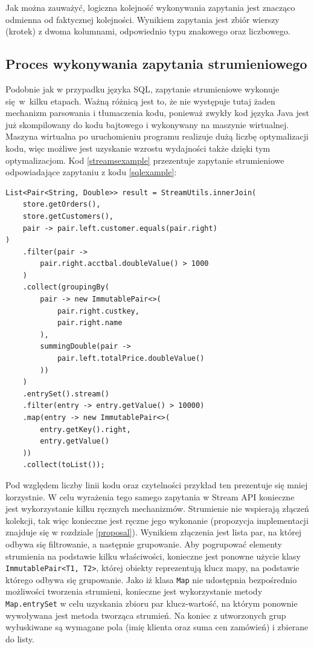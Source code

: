 \documentclass[12pt,twoside,openright]{extarticle}
\begin{document}
    Jak można zauważyć, logiczna kolejność wykonywania zapytania jest znacząco odmienna od faktycznej kolejności. Wynikiem zapytania jest zbiór wierszy (krotek) z dwoma kolumnami, odpowiednio typu znakowego oraz liczbowego.

\subsection{Proces wykonywania zapytania strumieniowego}

    Podobnie jak w przypadku języka SQL, zapytanie strumieniowe wykonuje się w~kilku etapach. Ważną różnicą jest to, że nie występuje tutaj żaden mechanizm parsowania i tłumaczenia kodu, ponieważ zwykły kod języka Java jest już skompilowany do kodu bajtowego i wykonywany na maszynie wirtualnej. Maszyna wirtualna po uruchomieniu programu realizuje dużą liczbę optymalizacji kodu, więc możliwe jest uzyskanie wzrostu wydajności także dzięki tym optymalizacjom. Kod \ref{streamsexample} przezentuje zapytanie strumieniowe odpowiadające zapytaniu z kodu \ref{sqlexample}:

\begin{lstlisting}[label=streamsexample, caption=Analogiczne rozwiązanie wykorzystujące Stream API]
List<Pair<String, Double>> result = StreamUtils.innerJoin(
    store.getOrders(),
    store.getCustomers(),
    pair -> pair.left.customer.equals(pair.right)
)
    .filter(pair ->
        pair.right.acctbal.doubleValue() > 1000
    )
    .collect(groupingBy(
        pair -> new ImmutablePair<>(
            pair.right.custkey,
            pair.right.name
        ),
        summingDouble(pair ->
            pair.left.totalPrice.doubleValue()
        ))
    )
    .entrySet().stream()
    .filter(entry -> entry.getValue() > 10000)
    .map(entry -> new ImmutablePair<>(
        entry.getKey().right,
        entry.getValue()
    ))
    .collect(toList());
\end{lstlisting}

    Pod względem liczby linii kodu oraz czytelności przykład ten prezentuje się mniej korzystnie. W celu wyrażenia tego samego zapytania w Stream API konieczne jest wykorzystanie kilku ręcznych mechanizmów. Strumienie nie wspierają złączeń kolekcji, tak więc konieczne jest ręczne jego wykonanie (propozycja implementacji znajduje się w rozdziale \ref{proposal}). Wynikiem złączenia jest lista par, na której odbywa się filtrowanie, a następnie grupowanie. Aby pogrupować elementy strumienia na podstawie kilku właściwości, konieczne jest ponowne użycie klasy \texttt{ImmutablePair<T1, T2>}, której obiekty reprezentują klucz mapy, na podstawie którego odbywa się grupowanie. Jako iż klasa \texttt{Map} nie udostępnia bezpośrednio możliwości tworzenia strumieni, konieczne jest wykorzystanie metody \texttt{Map.entrySet} w celu uzyskania zbioru par klucz-wartość, na którym ponownie wywoływana jest metoda tworząca strumień. Na koniec z utworzonych grup wyłuskiwane są wymagane pola (imię klienta oraz suma cen zamówień) i zbierane do listy.
\end{document}
